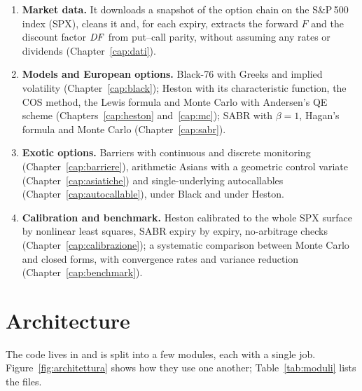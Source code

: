 \begin{enumerate}
\item \textbf{Market data.} It downloads a snapshot of the option chain on the S\&P\,500 index (SPX), cleans it and,
for each expiry, extracts the forward $F$ and the discount factor $\mathit{DF}$ from put--call parity, without assuming any
rates or dividends (Chapter~\ref{cap:dati}).
\item \textbf{Models and European options.} Black-76 with Greeks and implied volatility (Chapter~\ref{cap:black});
Heston with its characteristic function, the COS method, the Lewis formula and Monte Carlo with Andersen's QE scheme
(Chapters~\ref{cap:heston} and~\ref{cap:mc}); SABR with $\beta=1$, Hagan's formula and Monte Carlo
(Chapter~\ref{cap:sabr}).
\item \textbf{Exotic options.} Barriers with continuous and discrete monitoring (Chapter~\ref{cap:barriere}),
arithmetic Asians with a geometric control variate (Chapter~\ref{cap:asiatiche}) and single-underlying
autocallables (Chapter~\ref{cap:autocallable}), under Black and under Heston.
\item \textbf{Calibration and benchmark.} Heston calibrated to the whole SPX surface by nonlinear least squares, SABR
expiry by expiry, no-arbitrage checks (Chapter~\ref{cap:calibrazione}); a systematic comparison between Monte Carlo
and closed forms, with convergence rates and variance reduction (Chapter~\ref{cap:benchmark}).
\end{enumerate}

\section*{Architecture}
The code lives in  and is split into a few modules, each with a single job.
Figure~\ref{fig:architettura} shows how they use one another; Table~\ref{tab:moduli} lists the files.

